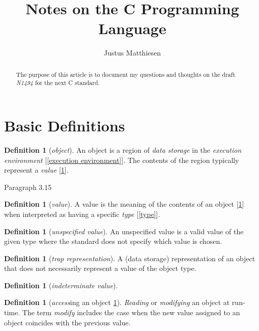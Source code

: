 \documentclass[12pt,a4paper,reqno]{article}
\title{Notes on the C Programming Language}
\author{Justus Matthiesen}
\theoremstyle{plain}
\theoremstyle{definition}
\newtheorem{definition}[subsection]{Definition}
\begin{document}
\maketitle

\begin{abstract}
The purpose of this article is to document my questions and thoughts on the draft \textit {N1494} for the next C standard.
\end{abstract}

\tableofcontents

\section{Basic Definitions}

\begin{definition}[\textit{object}]\label{object}
An object is a region of \textit{data storage} in the \textit{execution environment} [\ref{execution environment}]. The contents of the region typically represent a \textit{value} [\ref{value}].

\hfill\textsf{Paragraph 3.15}
\end{definition}

\begin{definition}[\textit{value}]\label{value}
A value is the meaning of the contents of an object [\ref{object}] when interpreted as having a specific \textit{type} [\ref{type}].
\end{definition}

\begin{definition}[\textit{unspecified value}]\label{unspecified value}
An unspecified value is a valid value of the given type where the standard does not specify which value is chosen.
\end{definition}

\begin{definition}[\textit{trap representation}]\label{trap representation}
A (data storage) representation of an object that does not necessarily represent a value of the object type.
\end{definition}


\begin{definition}[\textit{indeterminate value}]

\end{definition}


\begin{definition}[\textit{access}ing an object \ref{object}]\label{access}
\textit{Reading} or \textit{modifying} an object at run-time. The term \textit{modify} includes the case when the new value assigned to an object coincides with the previous value.
\end{definition}
\end{document}
